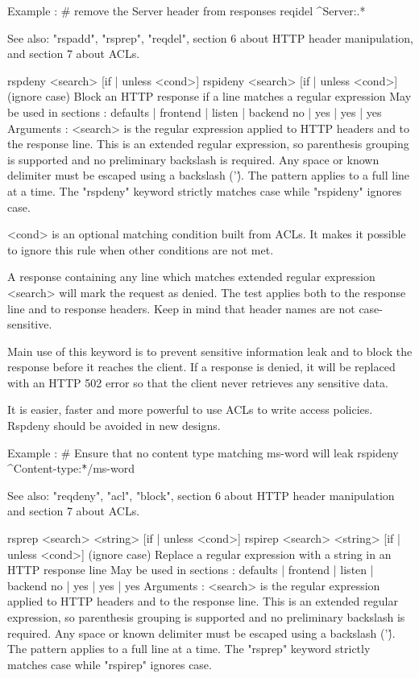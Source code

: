   Example :
     # remove the Server header from responses
     reqidel ^Server:.*

  See also: "rspadd", "rsprep", "reqdel", section 6 about HTTP header
            manipulation, and section 7 about ACLs.


rspdeny  <search> [{if | unless} <cond>]
rspideny <search> [{if | unless} <cond>]  (ignore case)
  Block an HTTP response if a line matches a regular expression
  May be used in sections :   defaults | frontend | listen | backend
                                 no    |    yes   |   yes  |   yes
  Arguments :
    <search>  is the regular expression applied to HTTP headers and to the
              response line. This is an extended regular expression, so
              parenthesis grouping is supported and no preliminary backslash
              is required. Any space or known delimiter must be escaped using
              a backslash ('\'). The pattern applies to a full line at a time.
              The "rspdeny" keyword strictly matches case while "rspideny"
              ignores case.

    <cond>    is an optional matching condition built from ACLs. It makes it
              possible to ignore this rule when other conditions are not met.

  A response containing any line which matches extended regular expression
  <search> will mark the request as denied. The test applies both to the
  response line and to response headers. Keep in mind that header names are not
  case-sensitive.

  Main use of this keyword is to prevent sensitive information leak and to
  block the response before it reaches the client. If a response is denied, it
  will be replaced with an HTTP 502 error so that the client never retrieves
  any sensitive data.

  It is easier, faster and more powerful to use ACLs to write access policies.
  Rspdeny should be avoided in new designs.

  Example :
     # Ensure that no content type matching ms-word will leak
     rspideny  ^Content-type:\.*/ms-word

  See also: "reqdeny", "acl", "block", section 6 about HTTP header manipulation
            and section 7 about ACLs.


rsprep  <search> <string> [{if | unless} <cond>]
rspirep <search> <string> [{if | unless} <cond>]  (ignore case)
  Replace a regular expression with a string in an HTTP response line
  May be used in sections :   defaults | frontend | listen | backend
                                 no    |    yes   |   yes  |   yes
  Arguments :
    <search>  is the regular expression applied to HTTP headers and to the
              response line. This is an extended regular expression, so
              parenthesis grouping is supported and no preliminary backslash
              is required. Any space or known delimiter must be escaped using
              a backslash ('\'). The pattern applies to a full line at a time.
              The "rsprep" keyword strictly matches case while "rspirep"
              ignores case.

